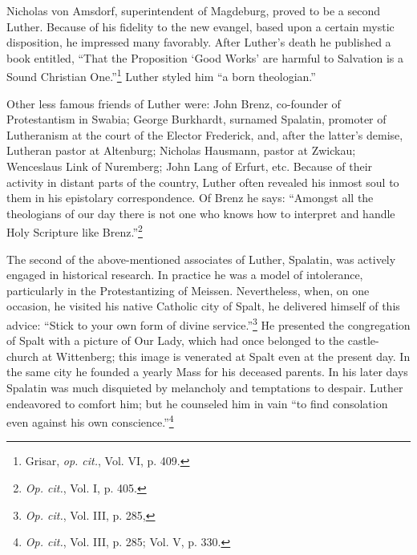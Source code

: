 Nicholas von Amsdorf, superintendent of Magdeburg, proved to
be a second Luther. Because of his fidelity to the new evangel, based
upon a certain mystic disposition, he impressed many favorably.
After Luther’s death he published a book entitled, “That the Proposition
‘Good Works’ are harmful to Salvation is a Sound Christian
One.”\footnote{Grisar, \textit{op. cit.}, Vol. VI, p. 409.}
 Luther styled him “a born theologian.”

Other less famous friends of Luther were: John Brenz, co-founder
of Protestantism in Swabia; George Burkhardt, surnamed Spalatin,
promoter of Lutheranism at the court of the Elector Frederick, and,
after the latter’s demise, Lutheran pastor at Altenburg; Nicholas
Hausmann, pastor at Zwickau; Wenceslaus Link of Nuremberg;
John Lang of Erfurt, etc. Because of their activity in distant parts of
the country, Luther often revealed his inmost soul to them in his
epistolary correspondence. Of Brenz he says: “Amongst all the theologians
of our day there is not one who knows how to interpret and
handle Holy Scripture like Brenz.”\footnote{\textit{Op. cit.}, Vol. I, p. 405.}

The second of the above-mentioned associates of Luther, Spalatin,
was actively engaged in historical research. In practice he was
a model of intolerance, particularly in the Protestantizing of
Meissen. Nevertheless, when, on one occasion, he visited his native
Catholic city of Spalt, he delivered himself of this advice: “Stick
to your own form of divine service.”\footnote{\textit{Op. cit.}, Vol. III, p. 285,}
He presented the congregation
of Spalt with a picture of Our Lady, which had once belonged
to the castle-church at Wittenberg; this image is venerated at Spalt
even at the present day. In the same city he founded a yearly Mass for
his deceased parents. In his later days Spalatin was much disquieted
by melancholy and temptations to despair. Luther endeavored to
comfort him; but he counseled him in vain “to find consolation even
against his own conscience.”\footnote{\textit{Op. cit.}, Vol. III, p. 285; Vol. V, p. 330.}

